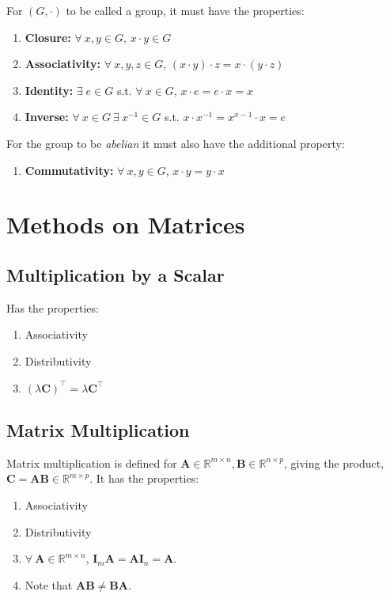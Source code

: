 \documentclass[10pt,twoside,twocolumn]{article}
\newcommand{\R}[0]{\mathds{R}} %
\begin{document}
For $\left(G,\cdot\right)$ to be called a group, it must have the
properties: 
\begin{enumerate}
\item \textbf{Closure:} $\forall\:x,y\in G$, $x\cdot y\in G$ 
\item \textbf{Associativity:} $\forall\:x,y,z\in G$, $\left(x\cdot y\right)\cdot z=x\cdot\left(y\cdot z\right)$ 
\item \textbf{Identity:} $\exists\;e\in G$ s.t. $\forall\:x\in G$, $x\cdot e=e\cdot x=x$ 
\item \textbf{Inverse:} $\forall\:x\in G\:\exists\:x^{-1}\in G$ s.t. $x\cdot x^{-1}=x^{x-1}\cdot x=e$ 
\end{enumerate}
For the group to be \emph{abelian} it must also have the additional
property: 
\begin{enumerate}
\item \textbf{Commutativity:} $\forall\:x,y\in G$, $x\cdot y=y\cdot x$ 
\end{enumerate}

\section{Methods on Matrices}


\subsection{Multiplication by a Scalar}

Has the properties: 
\begin{enumerate}
\item Associativity 
\item Distributivity 
\item $\left(\lambda\mathbf{C}\right)^{\top}=\lambda\mathbf{C}^{\top}$ 
\end{enumerate}

\subsection{Matrix Multiplication}

Matrix multiplication is defined for $\mathbf{A}\in\R^{m\times n},\mathbf{B}\in\R^{n\times p}$,
giving the product, $\mathbf{C}=\mathbf{AB}\in\R^{m\times p}$. It
has the properties: 
\begin{enumerate}
\item Associativity 
\item Distributivity 
\item $\forall\:\mathbf{A}\in\R^{m\times n}$, $\mathbf{I}_{m}\mathbf{A}=\mathbf{A}\mathbf{I}_{n}=\mathbf{A}$. 
\item Note that $\mathbf{AB}\neq\mathbf{BA}$. 
\end{enumerate}
\end{document}
